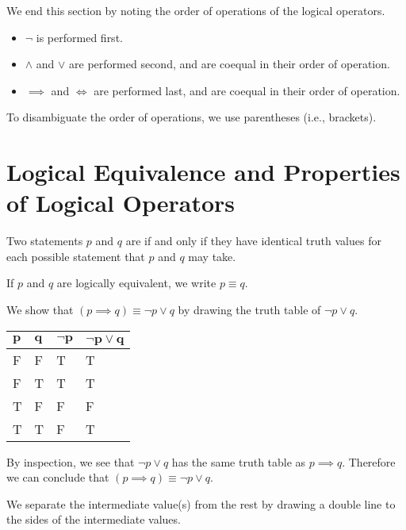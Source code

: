 We end this section by noting the order of operations of the logical operators.
\begin{itemize}
    \item $\lnot$ is performed first.
    \item $\land$ and $\lor$ are performed second, and are coequal in their order of operation.
    \item $\implies$ and $\iff$ are performed last, and are coequal in their order of operation.
\end{itemize}
To disambiguate the order of operations, we use parentheses (i.e., brackets).

\section{Logical Equivalence and Properties of Logical Operators}
\begin{definition}
    Two statements $p$ and $q$ are  if and only if they have identical truth values for each possible statement that $p$ and $q$ may take.
    
    If $p$ and $q$ are logically equivalent, we write $p \equiv q$.
\end{definition}

\begin{example}\label{example-implication-law}
    We show that $(p \implies q) \equiv \lnot p \lor q$ by drawing the truth table of $\lnot p \lor q$.
    \begin{table}[H]
        \centering
        \begin{tabular}{|l|l||l||l|}
            \hline
            $\boldsymbol{p}$ & $\boldsymbol{q}$ & $\boldsymbol{\lnot p}$ & $\boldsymbol{\lnot p \lor q}$ \\ \hline
            F & F & T & T \\ \hline
            F & T & T & T \\ \hline
            T & F & F & F \\ \hline
            T & T & F & T \\ \hline
        \end{tabular}
    \end{table}

    By inspection, we see that $\lnot p \lor q$ has the same truth table as $p \implies q$. Therefore we can conclude that $(p \implies q) \equiv \lnot p \lor q$.
\end{example}
\begin{remark}
    We separate the intermediate value(s) from the rest by drawing a double line to the sides of the intermediate values.
\end{remark}

